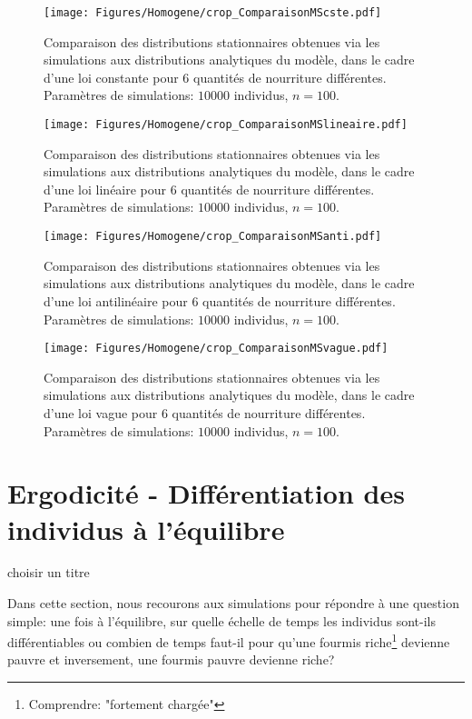 \begin{figure}[h]
\centering
\texttt{[image: Figures/Homogene/crop\_ComparaisonMScste.pdf]}
\caption{Comparaison des distributions stationnaires obtenues via les simulations aux distributions analytiques du modèle, dans le cadre d'une loi constante pour 6 quantités de nourriture différentes. Paramètres de simulations: $10000$ individus, $n=100$.}
\label{ComparaisonMScste}
\end{figure}

\begin{figure}[h]
\centering
\texttt{[image: Figures/Homogene/crop\_ComparaisonMSlineaire.pdf]}
\caption{Comparaison des distributions stationnaires obtenues via les simulations aux distributions analytiques du modèle, dans le cadre d'une loi linéaire pour 6 quantités de nourriture différentes. Paramètres de simulations: $10000$ individus, $n=100$.}
\label{ComparaisonMSlineaire}
\end{figure}

\begin{figure}[h]
\centering
\texttt{[image: Figures/Homogene/crop\_ComparaisonMSanti.pdf]}
\caption{Comparaison des distributions stationnaires obtenues via les simulations aux distributions analytiques du modèle, dans le cadre d'une loi antilinéaire pour 6 quantités de nourriture différentes. Paramètres de simulations: $10000$ individus, $n=100$.}
\label{ComparaisonMSanti}
\end{figure}

\begin{figure}[h]
\centering
\texttt{[image: Figures/Homogene/crop\_ComparaisonMSvague.pdf]}
\caption{Comparaison des distributions stationnaires obtenues via les simulations aux distributions analytiques du modèle, dans le cadre d'une loi vague pour 6 quantités de nourriture différentes. Paramètres de simulations: $10000$ individus, $n=100$.}
\label{ComparaisonMSvague}
\end{figure}

\section{Ergodicité - Différentiation des individus à l'équilibre}

choisir un titre

Dans cette section, nous recourons aux simulations pour répondre à une question simple: une fois à l'équilibre, sur quelle échelle de temps les individus sont-ils différentiables ou combien de temps faut-il pour qu'une fourmis riche\footnote{Comprendre: "fortement chargée"} devienne pauvre et inversement, une fourmis pauvre devienne riche?\\


